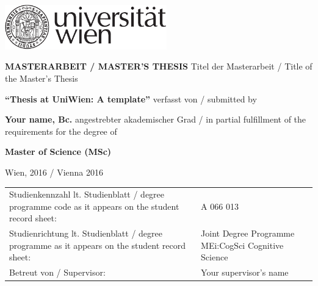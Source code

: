 \documentclass[a4paper,11pt]{report}
\newcommand{\linespacing}{1.5}
\renewcommand{\baselinestretch}{\linespacing}
\renewcommand{\arraystretch}{1.4}
\begin{document}

\thispagestyle{empty}
\begin{flushright}
\includegraphics[width=7cm]{uni1-eps-converted-to}
\end{flushright}	
\vskip20mm
\begin{center}
\huge\textbf{MASTERARBEIT / MASTER'S THESIS}
\vskip15mm
\normalsize{Titel der Masterarbeit / Title of the Master's Thesis}

\LARGE\textbf{``Thesis at UniWien: A template''} %
\vskip15mm
\normalsize{verfasst von / submitted by}

\Large\textbf{Your name, Bc.} %
\vskip15mm
\normalsize{angestrebter akademischer Grad / in partial fulfillment of the requirements for the degree of}

\Large\textbf{Master of Science (MSc)}

\small
\end{center}
\vskip15mm
\begingroup
\renewcommand{\arraystretch}{1.2}
\begin{flushleft}
	Wien, 2016 / Vienna 2016 %
	\vfill
\addtolength{\tabcolsep}{-6pt} 
\begin{table}[h!]
	\begingroup
	\renewcommand*{\arraystretch}{1.2}
	\renewcommand\baselinestretch{1}
	\small
	\begin{tabular}{p{7cm} p{10cm}}
		Studienkennzahl lt. Studienblatt / \newline degree programme code as it appears on \newline the student record sheet: & A 066 013 \\
		Studienrichtung lt. Studienblatt / \newline degree programme as it appears on \newline the student record sheet:& Joint Degree Programme MEi:CogSci Cognitive Science \\
		Betreut von / Supervisor: & Your supervisor's name \\ %
	\end{tabular}
	\endgroup
\end{table}
\addtolength{\tabcolsep}{6pt} 
\end{flushleft}	
\endgroup	
\end{document}
